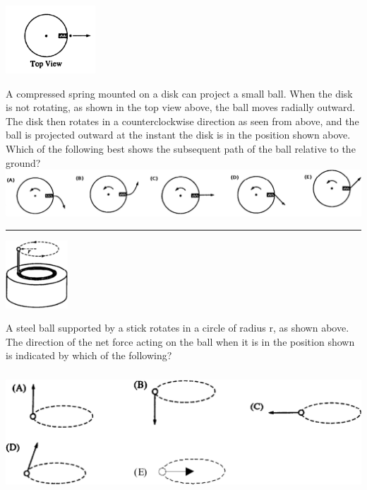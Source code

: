 \documentclass[10pt]{examdesign}
\begin{document}
\begin{multiplechoice} [title={Multiple Choice},
	rearrange=no]
\begin{question}
\end{question}

\begin{question}
\begin{center}
	\includegraphics[height=1in]{disktop.png}
\end{center}
A compressed spring mounted on a disk can project a small ball. When the disk is not rotating, as shown in the top view above, the ball moves radially outward. The disk then rotates in a counterclockwise direction as seen from above, and the ball is projected outward at the instant the disk is in the position shown above. Which of the following best shows the subsequent path of the ball relative to the ground?
\includegraphics[height=.75in]{diskbottom.png}
\\ \hrule
	\end{question}


\begin{question}

	\begin{center}
		\includegraphics[height=1in]{circled.png}
	\end{center}
		
A steel ball supported by a stick rotates in a circle of radius r, as shown above. The direction of the net
force acting on the ball when it is in the position shown is indicated by which of the following?

\includegraphics[height=1.75in]{circleda.png}
	\end{question}


\end{multiplechoice} 
\end{document}
